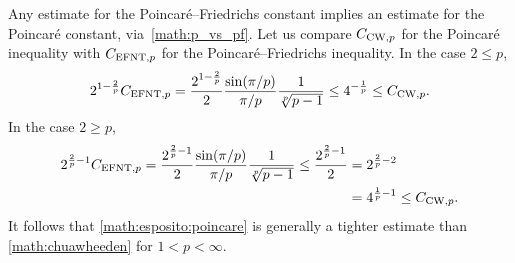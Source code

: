 \documentclass[10pt,a4paper]{article}
\begin{document}
\begin{remark}
    Any estimate for the Poincar\'e--Friedrichs constant implies an estimate for the Poincar\'e constant, via~\eqref{math:p_vs_pf}. 
    Let us compare $C_{{\rm CW},p}$ for the Poincar\'e inequality
    with $C_{{\rm EFNT},p}$ for the Poincar\'e--Friedrichs inequality. 
    In the case $2 \leq p$, 
    \begin{align*}
        2^{1-\frac 2 p}
        C_{{\rm EFNT},p}
        =
        \frac{ 2^{1-\frac 2 p} }{2}
        \frac{ \sin(\pi/p) }{ \pi/p }
        \frac{ 1 }{ \sqrt[p]{p-1} }
        \leq 
        4^{-\frac 1 p}
        \leq
        C_{{\rm CW},p} 
        .
    \end{align*}
    In the case $2 \geq p$, 
    \begin{align*}
        2^{\frac 2 p - 1}
        C_{{\rm EFNT},p}
        =
        \frac{ 2^{\frac 2 p - 1} }{2}
        \frac{ \sin(\pi/p) }{ \pi/p }
        \frac{ 1 }{ \sqrt[p]{p-1} }
        \leq
        \frac{ 2^{\frac 2 p-1} }{2}
        &
        =
        2^{\frac 2 p - 2}
        \\&
        =
        4^{\frac 1 p - 1}
        \leq
        C_{{\rm CW},p} 
        .
    \end{align*}
    It follows that \eqref{math:esposito:poincare} is generally a tighter estimate than \eqref{math:chuawheeden} for $1 < p < \infty$.
\end{remark}
\end{document}
